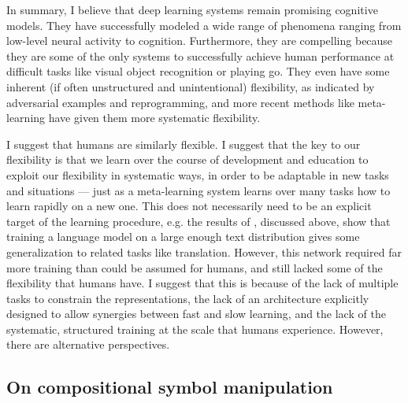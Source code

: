 In summary, I believe that deep learning systems remain promising cognitive models. They have successfully modeled a wide range of phenomena ranging from low-level neural activity to cognition. Furthermore, they are compelling because they are some of the only systems to successfully achieve human performance at difficult tasks like visual object recognition or playing go. They even have some inherent (if often unstructured and unintentional) flexibility, as indicated by adversarial examples and reprogramming, and more recent methods like meta-learning have given them more systematic flexibility. \par
I suggest that humans are similarly flexible. I suggest that the key to our flexibility is that we learn over the course of development and education to exploit our flexibility in systematic ways, in order to be adaptable in new tasks and situations --- just as a meta-learning system learns over many tasks how to learn rapidly on a new one. This does not necessarily need to be an explicit target of the learning procedure, e.g. the results of \citet{Radford2019}, discussed above, show that training a language model on a large enough text distribution gives some generalization to related tasks like translation. However, this network required far more training than could be assumed for humans, and still lacked some of the flexibility that humans have. I suggest that this is because of the lack of multiple tasks to constrain the representations, the lack of an architecture explicitly designed to allow synergies between fast and slow learning, and the lack of the systematic, structured training at the scale that humans experience. However, there are alternative perspectives. \par 

\subsection{On compositional symbol manipulation} \label{sec:introduction:on_compositional}

